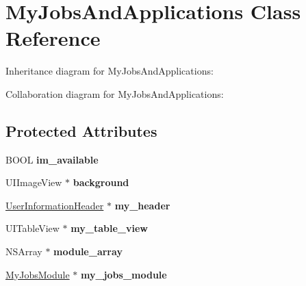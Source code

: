 \hypertarget{interface_my_jobs_and_applications}{
\section{\-My\-Jobs\-And\-Applications \-Class \-Reference}
\label{interface_my_jobs_and_applications}
}


\-Inheritance diagram for \-My\-Jobs\-And\-Applications\-:


\-Collaboration diagram for \-My\-Jobs\-And\-Applications\-:
\subsection*{\-Protected \-Attributes}
\begin{DoxyCompactItemize}
\item 
\hypertarget{interface_my_jobs_and_applications_a2e7ebc923055b8aff4c247095ada1049}{
\-B\-O\-O\-L {\bfseries im\-\_\-available}}
\label{interface_my_jobs_and_applications_a2e7ebc923055b8aff4c247095ada1049}

\item 
\hypertarget{interface_my_jobs_and_applications_a424e4c11ed7800a17fd6498901651361}{
\-U\-I\-Image\-View $\ast$ {\bfseries background}}
\label{interface_my_jobs_and_applications_a424e4c11ed7800a17fd6498901651361}

\item 
\hypertarget{interface_my_jobs_and_applications_a672b7834d1355f505a52e2d99aa05cb9}{
\hyperlink{interface_user_information_header}{\-User\-Information\-Header} $\ast$ {\bfseries my\-\_\-header}}
\label{interface_my_jobs_and_applications_a672b7834d1355f505a52e2d99aa05cb9}

\item 
\hypertarget{interface_my_jobs_and_applications_afa22bb32674b4ba27f6499c29f80c98f}{
\-U\-I\-Table\-View $\ast$ {\bfseries my\-\_\-table\-\_\-view}}
\label{interface_my_jobs_and_applications_afa22bb32674b4ba27f6499c29f80c98f}

\item 
\hypertarget{interface_my_jobs_and_applications_adf6cd29d36057f54d88abc12678b7d63}{
\-N\-S\-Array $\ast$ {\bfseries module\-\_\-array}}
\label{interface_my_jobs_and_applications_adf6cd29d36057f54d88abc12678b7d63}

\item 
\hypertarget{interface_my_jobs_and_applications_a812952e6bad99cf38344906d963a7965}{
\hyperlink{interface_my_jobs_module}{\-My\-Jobs\-Module} $\ast$ {\bfseries my\-\_\-jobs\-\_\-module}}
\label{interface_my_jobs_and_applications_a812952e6bad99cf38344906d963a7965}

\end{DoxyCompactItemize}
